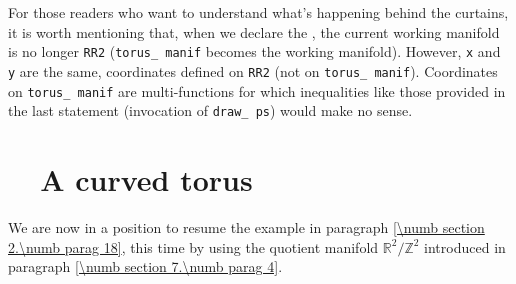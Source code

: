 For those readers who want to understand what's happening behind the curtains,
it is worth mentioning that, when we declare the {\small\tt{}}
{\small\tt{}}, the current working manifold is no longer {\small\tt RR2}
({\small\tt torus\_\,manif} becomes the working manifold).
However, {\small\tt x} and {\small\tt y} are the same, coordinates defined on {\small\tt RR2}
(not on {\small\tt torus\_\,manif}).
Coordinates on {\small\tt torus\_\,manif} are multi-functions for which inequalities like
those provided in the last statement (invocation of {\small\tt draw\_\,ps}) would make no sense.


\section{~~A curved torus}\label{\numb section 7.\numb parag 5}

We are now in a position to resume the example in paragraph \ref{\numb section 2.\numb parag 18},
this time by using the quotient manifold $ \mathbb{R}^2/{\mathbb Z}^2 $ introduced in paragraph
\ref{\numb section 7.\numb parag 4}.


